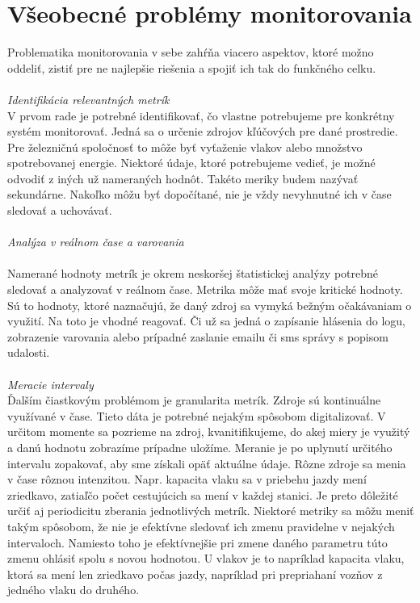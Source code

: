 \documentclass[11pt,final,oneside]{fithesis}
\begin{document}
\section{Všeobecné problémy monitorovania}
Problematika monitorovania v sebe zahŕňa viacero aspektov, ktoré možno oddeliť, zistiť pre ne najlepšie riešenia a spojiť ich tak do funkčného celku. 
\\
\\ \emph{Identifikácia relevantných metrík}
\\
V prvom rade je potrebné identifikovať, čo vlastne potrebujeme pre konkrétny systém
monitorovať. Jedná sa o určenie zdrojov kľúčových pre dané prostredie. Pre železničnú spoločnosť to môže byť vyťaženie vlakov alebo množstvo spotrebovanej energie. Niektoré údaje, ktoré potrebujeme vedieť, je možné odvodiť z iných už
nameraných hodnôt. Takéto meriky budem nazývať sekundárne. Nakoľko môžu byť dopočítané, nie je vždy nevyhnutné ich v čase sledovať a uchovávať.
\\
\\ \emph{Analýza v reálnom čase a varovania}
\\
\\Namerané hodnoty metrík je okrem neskoršej štatistickej analýzy potrebné sledovať a analyzovať v reálnom čase. Metrika môže mať svoje kritické hodnoty. Sú to hodnoty, ktoré naznačujú, že daný zdroj sa vymyká bežným očakávaniam o využití.
Na toto je vhodné reagovať. Či už sa jedná o zapísanie hlásenia do logu, zobrazenie varovania alebo prípadné zaslanie emailu či sms správy s popisom udalosti.
\\
\\ \emph{Meracie intervaly}
\\
Ďalším čiastkovým problémom je granularita metrík. Zdroje sú kontinuálne využívané v čase. Tieto dáta je potrebné nejakým spôsobom digitalizovať. V určitom momente sa pozrieme na zdroj, kvanitifikujeme, do akej miery je využitý a danú
hodnotu zobrazíme prípadne uložíme. Meranie je po uplynutí určitého intervalu zopakovať, aby sme získali opäť aktuálne údaje. Rôzne zdroje sa menia v čase rôznou intenzitou. Napr. kapacita vlaku sa v priebehu jazdy mení zriedkavo, zatiaľčo
počet cestujúcich sa mení v každej stanici. Je preto dôležité určiť aj periodicitu zberania jednotlivých metrík. Niektoré metriky sa môžu meniť takým spôsobom, že nie je efektívne sledovať ich zmenu pravidelne v nejakých intervaloch. Namiesto
toho je efektívnejšie pri zmene daného parametru túto zmenu ohlásiť spolu s novou hodnotou. U vlakov je to napríklad kapacita vlaku, ktorá sa mení len zriedkavo počas jazdy, napríklad pri prepriahaní vozňov z jedného vlaku do druhého.
\end{document}
